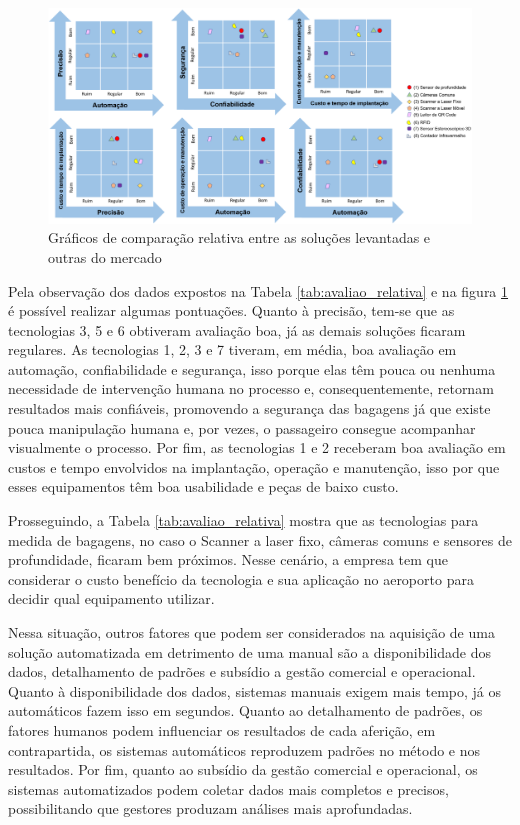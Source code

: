         \begin{figure}[h]
           \centering
           \includegraphics[width=1\textwidth]{imagens/graficos_comparacao_entre_tecnologias.png}
           \caption{Gráficos de comparação relativa entre as soluções levantadas e outras do mercado}
          \label{fig:graficos_comparacao_entre_tecnologias}
        \end{figure}


Pela observação dos dados expostos na Tabela \ref{tab:avaliao_relativa} e na figura \ref{fig:graficos_comparacao_entre_tecnologias} é possível realizar algumas pontuações. Quanto à precisão, tem-se que as tecnologias 3, 5 e 6 obtiveram avaliação boa, já as demais soluções ficaram regulares. As tecnologias 1, 2, 3 e 7 tiveram, em média, boa avaliação em automação, confiabilidade e segurança, isso porque elas têm pouca ou nenhuma necessidade de intervenção humana no processo e, consequentemente, retornam resultados mais confiáveis, promovendo a segurança das bagagens já que existe pouca manipulação humana e, por vezes, o passageiro consegue acompanhar visualmente o processo. Por fim, as tecnologias 1 e 2 receberam boa avaliação em custos e tempo envolvidos na implantação, operação e manutenção, isso por que esses equipamentos têm boa usabilidade e peças de baixo custo. 

Prosseguindo, a Tabela \ref{tab:avaliao_relativa} mostra que as tecnologias para medida de bagagens, no caso o  Scanner a laser fixo, câmeras comuns e sensores de profundidade, ficaram bem próximos. Nesse cenário, a empresa tem que considerar o custo benefício da tecnologia e sua aplicação no aeroporto para decidir qual equipamento utilizar.

Nessa situação, outros fatores que podem ser considerados na aquisição de uma solução automatizada em detrimento de uma manual são a disponibilidade dos dados, detalhamento de padrões e subsídio a gestão comercial e operacional. Quanto à disponibilidade dos dados, sistemas manuais exigem mais tempo, já os automáticos fazem isso em segundos. Quanto ao detalhamento de padrões, os fatores humanos podem influenciar os resultados de cada aferição, em contrapartida, os sistemas automáticos reproduzem padrões no método e nos resultados. Por fim, quanto ao subsídio da gestão comercial e operacional, os sistemas automatizados podem coletar dados mais completos e precisos, possibilitando que gestores produzam análises mais aprofundadas.




